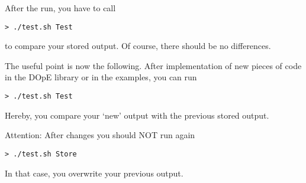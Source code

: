 After the run, you have to call 
\begin{verbatim}
> ./test.sh Test
\end{verbatim}
to compare your stored output. Of course, there should be no differences.

The useful point is now the following. After implementation of 
new pieces of code in the DOpE library or in the examples, you can
run 
\begin{verbatim}
> ./test.sh Test
\end{verbatim}
Hereby, you compare your `new' output with the previous stored output.

Attention: After changes you should NOT run again
\begin{verbatim}
> ./test.sh Store
\end{verbatim}
In that case, you overwrite your previous output.
